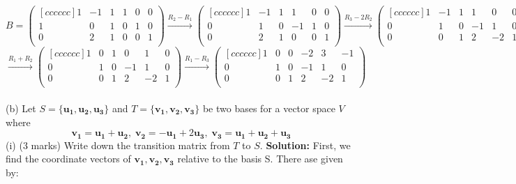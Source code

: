 \documentclass{article}
\begin{document}
$$
B=
            \begin{pmatrix}[cccccc]
                1 & -1 & 1 & 1 & 0 & 0 \\
                1 & 0 & 1 & 0 & 1 & 0 \\
                0 & 2 & 1 & 0 & 0 & 1 \\ 
            \end{pmatrix}
            \xrightarrow{R_2 - R_1}
            \begin{pmatrix}[cccccc]
                1 & -1 & 1 & 1 & 0 & 0 \\
                0 & 1 & 0 & -1 & 1 & 0 \\
                0 & 2 & 1 & 0 & 0 & 1 \\ 
            \end{pmatrix}
            \xrightarrow{R_3 -2 R_2}
            \begin{pmatrix}[cccccc]
                1 & -1 & 1 & 1 & 0 & 0 \\
                0 & 1 & 0 & -1 & 1 & 0 \\
                0 & 0 & 1 & 2 & -2 & 1 \\ 
            \end{pmatrix}
$$
$$
            \xrightarrow{R_1 + R_2}
            \begin{pmatrix}[cccccc]
                1 & 0 & 1 & 0 & 1 & 0 \\
                0 & 1 & 0 & -1 & 1 & 0 \\
                0 & 0 & 1 & 2 & -2 & 1 \\ 
            \end{pmatrix}
            \xrightarrow{R_1 - R_3}
            \begin{pmatrix}[cccccc]
                1 & 0 & 0 & -2 & 3 & -1 \\
                0 & 1 & 0 & -1 & 1 & 0 \\
                0 & 0 & 1 & 2 & -2 & 1 \\ 
            \end{pmatrix}
$$
\newline
\\ (b) Let $S = \{\bm{u_1, u_2, u_3}\}$ and $T = \{\bm{v_1, v_2, v_3}\}$  be two bases for a vector space $V$
where
$$\bm{v_1} = \bm{u_1} + \bm{u_2}, \; \bm{v_2} = - \bm{u_1} + 2 \bm{u_3}, \; \bm{v_3} = \bm{u_1} + \bm{u_2} + \bm{u_3}$$
(i) (3 marks) Write down the transition matrix from $T$ to $S$.
\newline
\textbf{Solution:}
First, we find the coordinate vectors of $\bm{v_1}, \bm{v_2}, \bm{v_3}$ relative to the basis S. There ase given by:
\end{document}
